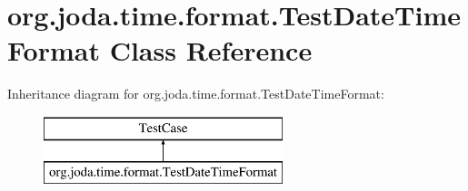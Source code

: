 \hypertarget{classorg_1_1joda_1_1time_1_1format_1_1_test_date_time_format}{\section{org.\-joda.\-time.\-format.\-Test\-Date\-Time\-Format Class Reference}
\label{classorg_1_1joda_1_1time_1_1format_1_1_test_date_time_format}
}
Inheritance diagram for org.\-joda.\-time.\-format.\-Test\-Date\-Time\-Format\-:\begin{figure}[H]
\begin{center}
\leavevmode
\includegraphics[height=2.000000cm]{classorg_1_1joda_1_1time_1_1format_1_1_test_date_time_format}
\end{center}
\end{figure}
